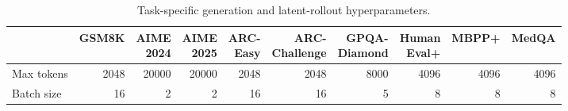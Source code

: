 \documentclass[11pt]{article}
\begin{document}

\begin{table}[t]
\centering
\begin{adjustbox}{max width=\textwidth}
\begin{tabular}{lrrrrrrrrr}
\toprule
& GSM8K
& \makecell{AIME\\2024}
& \makecell{AIME\\2025}
& \makecell{ARC-\\Easy}
& \makecell{ARC-\\Challenge}
& \makecell{GPQA-\\Diamond}
& \makecell{Human\\Eval+}
& MBPP+
& MedQA \\
\midrule
Max tokens         & 2048 & 20000 & 20000 & 2048 & 2048 & 8000 & 4096 & 4096 & 4096 \\
Batch size         & 16   & 2     & 2     & 16   & 16   & 5    & 8    & 8    & 8 \\
\bottomrule
\end{tabular}
\end{adjustbox}
\caption{Task-specific generation and latent-rollout hyperparameters.}
\label{tab:task_hyperparameters}
\end{table}
\end{document}
